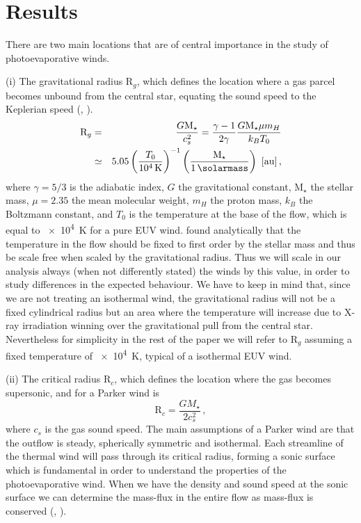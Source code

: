 \documentclass[usenatbib,useAMS,usedcolumn]{mnras}
\begin{document}
\section{Results}\label{sec:results}

There are two main locations that are of central importance in the study of photoevaporative winds.

(i) The gravitational radius $\mathrm{R}_g$, which defines the location where a gas parcel becomes unbound from the central star, equating the sound speed to the Keplerian speed (, ).
\begin{eqnarray}\label{eq:rg}
  \mathrm{R}_g &=& \frac{G \mathrm{M}_\star}{c_s^2} = \frac{\gamma-1}{2\gamma} \frac{G \mathrm{M}_\star \mu m_H}{k_B T_0} \nonumber \\ 
  &\simeq& 5.05 \left(\frac{T_0}{\SI{e4}{\kelvin}}\right)^{-1} \left(\frac{\mathrm{M}_\star}{\SI{1}{\solarmass}}\right) \ [\si{\astronomicalunit}] \,,
\end{eqnarray}
where $\gamma=5/3$ is the adiabatic index, $G$ the gravitational constant, $\mathrm{M}_\star$ the stellar mass, $\mu = 2.35$ the mean molecular weight, $m_H$ the proton mass, $k_B$ the Boltzmann constant, and $T_0$ is the temperature at the base of the flow, which is equal to \SI{e4}{\kelvin} for a pure EUV wind. 
 found analytically that the temperature in the flow should be fixed to first order by the stellar mass and thus be scale free when scaled by the gravitational radius.
Thus we will scale in our analysis always (when not differently stated) the winds by this value, in order to study differences in the expected behaviour. We have to keep in mind that, since we are not treating an isothermal wind, the gravitational radius will not be a fixed cylindrical radius but an area where the temperature will increase due to X-ray irradiation winning over the gravitational pull from the central star. Nevertheless for simplicity in the rest of the paper we will refer to $\mathrm{R}_g$ assuming a fixed temperature of \SI{e4}{K}, typical of a isothermal EUV wind.

(ii) The critical radius $\mathrm{R}_c$, which defines the location where the gas becomes supersonic, and for a Parker wind is 
\begin{equation}\label{eq:rcrit}
    \mathrm{R}_c = \frac{G M_\star}{2 c_s^2}\,,
\end{equation}
where $c_s$ is the gas sound speed. The main assumptions of a Parker wind are that the outflow is steady, spherically symmetric and isothermal. Each streamline of the thermal wind will pass through its critical radius, forming a sonic surface which is fundamental in order to understand the properties of the photoevaporative wind. When we have the density and sound speed at the sonic surface we can determine the mass-flux in the entire flow as mass-flux is conserved (, ).
\end{document}
